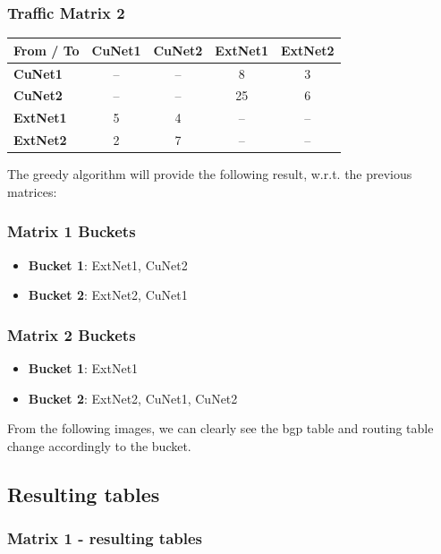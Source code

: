 \documentclass{report}
\begin{document}
\subsubsection{Traffic Matrix 2}
\begin{table}[h]
\centering
\label{tab:traffic-matrix-2}
\begin{tabular}{|l|c|c|c|c|}
\hline
\textbf{From / To} & \textbf{CuNet1} & \textbf{CuNet2} & \textbf{ExtNet1} & \textbf{ExtNet2} \\
\hline
\textbf{CuNet1}   & -- & -- & 8  & 3 \\
\hline
\textbf{CuNet2}   & -- & -- & 25 & 6 \\
\hline
\textbf{ExtNet1}  & 5  & 4  & -- & -- \\
\hline
\textbf{ExtNet2}  & 2  & 7  & -- & -- \\
\hline
\end{tabular}
\end{table}

The greedy algorithm will provide the following result, w.r.t. the previous matrices:

\subsubsection{Matrix 1 Buckets}
\begin{itemize}
    \item \textbf{Bucket 1}: ExtNet1, CuNet2
    \item \textbf{Bucket 2}: ExtNet2, CuNet1
\end{itemize}

\subsubsection{Matrix 2 Buckets}
\begin{itemize}
    \item \textbf{Bucket 1}: ExtNet1
    \item \textbf{Bucket 2}: ExtNet2, CuNet1, CuNet2
\end{itemize}

From the following images, we can clearly see the bgp table and routing table change accordingly to the bucket.

\subsection{Resulting tables}
\subsubsection{Matrix 1 - resulting tables}
\end{document}
